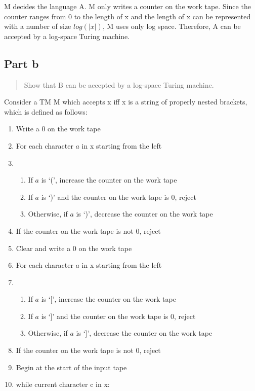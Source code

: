 \documentclass{article}
\begin{document}
M decides the language A.  M only writes a counter on the work tape.  Since the counter ranges from 0 to the length of x and the length of x can be represented with a number of size $log(|x|)$, M uses only log space.  Therefore, A can be accepted by a log-space Turing machine.

\subsection{Part b}
\begin{quote}
Show that B can be accepted by a log-space Turing machine.
\end{quote}

Consider a TM M which accepts x iff x is a string of properly nested brackets, which is defined as follows:
\begin{enumerate}[label=]
\item Write a 0 on the work tape
\item For each character $a$ in x starting from the left
\item \begin{enumerate}[label=]
\item If $a$ is `(', increase the counter on the work tape
\item If $a$ is `)' and the counter on the work tape is 0, reject
\item Otherwise, if $a$ is `)', decrease the counter on the work tape
\end{enumerate}
\item If the counter on the work tape is not 0, reject

\item Clear and write a 0 on the work tape
\item For each character $a$ in x starting from the left
\item \begin{enumerate}[label=]
\item If $a$ is `[', increase the counter on the work tape
\item If $a$ is `]' and the counter on the work tape is 0, reject
\item Otherwise, if $a$ is `]', decrease the counter on the work tape
\end{enumerate}
\item If the counter on the work tape is not 0, reject
\item Begin at the start of the input tape
\item while current character c in x:
\begin{enumerate}[label=]


\end{enumerate}
\end{enumerate}
\end{document}
